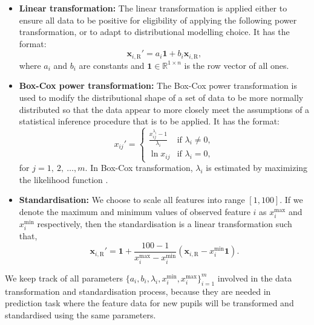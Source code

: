 \begin{itemize}
\item \textbf{Linear transformation:} The linear transformation is applied either to ensure all data to be positive for eligibility of applying the following power transformation, or to adapt to distributional modelling choice. It has the format:
\begin{equation}
\mathbf{x}_{i,\text{R}}' = a_i \mathbf{1} + b_i \mathbf{x}_{i,\text{R}},
\end{equation}
where $a_i$ and $b_i$ are constants and $\mathbf{1} \in \mathbb{R}^{1 \times n}$ is the row vector of all ones.
\item \textbf{Box-Cox power transformation:} The Box-Cox power transformation is used to modify the distributional shape of a set of data to be more normally distributed so that the data appear to more closely meet the assumptions of a statistical inference procedure that is to be applied. It has the format:
\begin{equation}
x_{ij}' = 
\begin{cases}
\frac{x_{ij}^{\lambda_i}-1}{\lambda_i} & \text{if } \lambda_i \neq 0, \\
\ln{x_{ij}} & \text{if } \lambda_i = 0,
\end{cases}
\end{equation}
for $j = 1, ~2, ~\dots, m$. In Box-Cox transformation, $\lambda_i$ is estimated by maximizing the likelihood function \cite{Box64ananalysis}.
\item \textbf{Standardisation:} We choose to scale all features into range $[1, 100]$. If we denote the maximum and minimum values of observed feature $i$ as $x_i^\text{max}$ and $x_i^\text{min}$ respectively, then the standardisation is a linear transformation such that,
\begin{equation}
\mathbf{x}_{i,\text{R}}' = \mathbf{1} + \frac{100-1}{x_i^\text{max}-x_i^\text{min}} \left( \mathbf{x}_{i,\text{R}} - x_i^\text{min} \mathbf{1} \right).
\end{equation}
\end{itemize}

We keep track of all parameters $\{ a_i, b_i, \lambda_i, x_i^\text{min}, x_i^\text{max}\}_{i=1}^m$ involved in the data transformation and standardisation process, because they are needed in prediction task where the feature data for new pupils will be transformed and standardised using the same parameters.